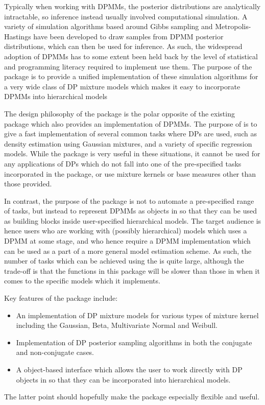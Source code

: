 \documentclass[nojss]{jss}
\begin{document}
Typically when working with DPMMs, the posterior distributions are analytically intractable, so inference instead usually involved computational simulation. A variety of simulation algorithms based around Gibbs sampling and Metropolis-Hastings have been developed to draw samples from DPMM posterior distributions, which can then be used for inference. As such, the widespread adoption of DPMMs has to some extent been held back by the level of statistical and programming literacy required to implement use them. The purpose of the  package is to provide a unified implementation of these simulation algorithms for a very wide class of DP mixture models which makes it easy to incorporate DPMMs into hierarchical models

The design philosophy of the  package is the polar opposite of the existing    package which also provides an implementation of DPMMs. The purpose of  is to give a fast implementation of several common tasks where DPs are used, such as density estimation using Gaussian mixtures, and a variety of specific regression models. While the  package is very useful in these situations, it cannot be used for any applications of DPs which do not fall into one of the pre-specified tasks incorporated in the package, or use mixture kernels or base measures other than those provided.

In contrast, the purpose of the  package is not to automate a pre-specified range of tasks, but instead to represent DPMMs as objects in  so that they can be used as building blocks inside user-specified hierarchical models. The target audience is hence users who are working with  (possibly hierarchical) models which uses a DPMM at some stage, and who hence require a DPMM implementation which can be used as a part of a more general model estimation scheme.  As such, the number of tasks which can be achieved using the  is quite large, although the trade-off is that the functions in this package will be slower than those in  when it comes to the specific models which it implements.

Key features of the  package include:
\begin{itemize}
\item An implementation of DP mixture models for various types of mixture kernel including the Gaussian, Beta, Multivariate Normal and Weibull.
\item Implementation of DP posterior sampling algorithms in both the conjugate and non-conjugate cases.
\item A object-based interface which allows the user to work directly with DP objects in  so that they can be incorporated into hierarchical models.
\end{itemize}
The latter point should hopefully make the package especially flexible and useful.
\end{document}
